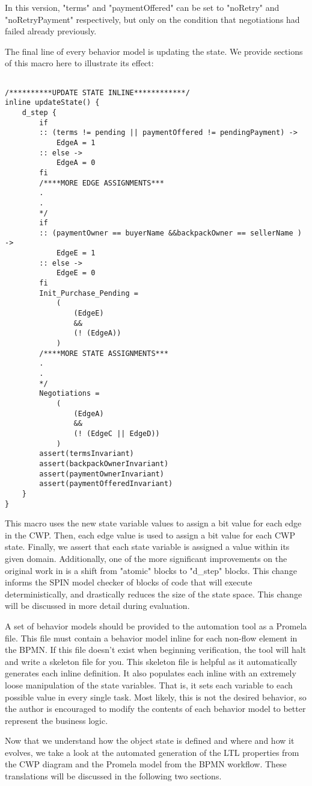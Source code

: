 In this version, "terms" and "paymentOffered" can be set to "noRetry" and "noRetryPayment" respectively, but only on the condition that negotiations had failed already previously.

The final line of every behavior model is updating the state. We provide sections of this macro here to illustrate its effect:

\begin{lstlisting}[style=myPromela]

/**********UPDATE STATE INLINE************/
inline updateState() {
    d_step {
        if
        :: (terms != pending || paymentOffered != pendingPayment) -> 
            EdgeA = 1
        :: else -> 
            EdgeA = 0
        fi
        /****MORE EDGE ASSIGNMENTS***
        .
        .
        */
        if
        :: (paymentOwner == buyerName &&backpackOwner == sellerName ) -> 
            EdgeE = 1
        :: else -> 
            EdgeE = 0
        fi
        Init_Purchase_Pending = 
            (
                (EdgeE)
                &&
                (! (EdgeA))
            )
        /****MORE STATE ASSIGNMENTS***
        .
        .
        */
        Negotiations = 
            (
                (EdgeA)
                &&
                (! (EdgeC || EdgeD))
            )
        assert(termsInvariant)
        assert(backpackOwnerInvariant)
        assert(paymentOwnerInvariant)
        assert(paymentOfferedInvariant)
    }
}
\end{lstlisting}


This macro uses the new state variable values to assign a bit value for each edge in the CWP. Then, each edge value is used to assign a bit value for each CWP state. Finally, we assert that each state variable is assigned a value within its given domain. Additionally, one of the more significant improvements on the original work in \cite{mercer22} is a shift from "atomic" blocks to "d\_step" blocks. This change informs the SPIN model checker of blocks of code that will execute deterministically, and drastically reduces the size of the state space. This change will be discussed in more detail during evaluation.

A set of behavior models should be provided to the automation tool as a Promela file. This file must contain a behavior model inline for each non-flow element in the BPMN. If this file doesn't exist when beginning verification, the tool will halt and write a skeleton file for you. This skeleton file is helpful as it automatically generates each inline definition. It also populates each inline with an extremely loose manipulation of the state variables. That is, it sets each variable to each possible value in every single task. Most likely, this is not the desired behavior, so the author is encouraged to modify the contents of each behavior model to better represent the business logic.

Now that we understand how the object state is defined and where and how it evolves, we take a look at the automated generation of the LTL properties from the CWP diagram and the Promela model from the BPMN workflow. These translations will be discussed in the following two sections.

